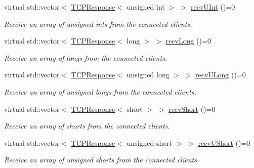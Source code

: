\begin{DoxyCompactItemize}
virtual std\+::vector$<$ \hyperlink{class_rad_jav_1_1_networking_1_1_t_c_p_response}{T\+C\+P\+Response}$<$ unsigned int $>$ $>$ \hyperlink{class_rad_jav_1_1_networking_1_1_tcpip_server_a6b1814817fe8685ed78183ea28094cd4}{recv\+U\+Int} ()=0
\begin{DoxyCompactList}\small\item\em Receive an array of unsigned ints from the connected clients. \end{DoxyCompactList}\item 
virtual std\+::vector$<$ \hyperlink{class_rad_jav_1_1_networking_1_1_t_c_p_response}{T\+C\+P\+Response}$<$ long $>$ $>$ \hyperlink{class_rad_jav_1_1_networking_1_1_tcpip_server_a5dd775d1470488bddb35f05422de1c94}{recv\+Long} ()=0
\begin{DoxyCompactList}\small\item\em Receive an array of longs from the connected clients. \end{DoxyCompactList}\item 
virtual std\+::vector$<$ \hyperlink{class_rad_jav_1_1_networking_1_1_t_c_p_response}{T\+C\+P\+Response}$<$ unsigned long $>$ $>$ \hyperlink{class_rad_jav_1_1_networking_1_1_tcpip_server_a840af1999f1e9679e3bfcaab56ee0e30}{recv\+U\+Long} ()=0
\begin{DoxyCompactList}\small\item\em Receive an array of unsigned longs from the connected clients. \end{DoxyCompactList}\item 
virtual std\+::vector$<$ \hyperlink{class_rad_jav_1_1_networking_1_1_t_c_p_response}{T\+C\+P\+Response}$<$ short $>$ $>$ \hyperlink{class_rad_jav_1_1_networking_1_1_tcpip_server_ac21be44d6a24c8aebebd53421ac2bef3}{recv\+Short} ()=0
\begin{DoxyCompactList}\small\item\em Receive an array of shorts from the connected clients. \end{DoxyCompactList}\item 
virtual std\+::vector$<$ \hyperlink{class_rad_jav_1_1_networking_1_1_t_c_p_response}{T\+C\+P\+Response}$<$ unsigned short $>$ $>$ \hyperlink{class_rad_jav_1_1_networking_1_1_tcpip_server_a6f248a025a0111d9c2038debc822a9ba}{recv\+U\+Short} ()=0
\begin{DoxyCompactList}\small\item\em Receive an array of unsigned shorts from the connected clients. \end{DoxyCompactList}\item 

\end{DoxyCompactItemize}
